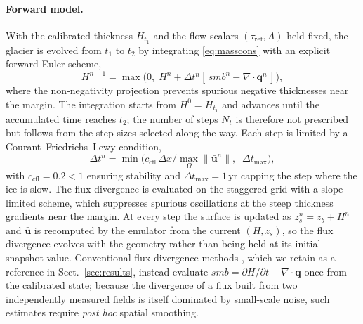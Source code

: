\paragraph{Forward model.}
With the calibrated thickness $H_{t_1}$ and the flow scalars
$(\tau_{\mathrm{ref}}, A)$ held fixed, the glacier is evolved from $t_1$ to $t_2$ by
integrating \eqref{eq:masscons} with an explicit forward-Euler scheme,
\begin{equation}
  H^{n+1} = \max\!\big(0,\; H^n + \Delta t^n [\,smb^n - \nabla\cdot\mathbf{q}^n\,]\big),
  \label{eq:euler}
\end{equation}
where the non-negativity projection prevents spurious negative thicknesses near the
margin. The integration starts from $H^0 = H_{t_1}$ and advances until the accumulated
time reaches $t_2$; the number of steps $N_t$ is therefore not prescribed but follows
from the step sizes selected along the way. Each step is limited by a
Courant--Friedrichs--Lewy condition,
\begin{equation}
  \Delta t^n = \min\!\Big(c_{\mathrm{cfl}}\,\Delta x \big/
  \max_\Omega\|\bar{\mathbf{u}}^n\|,\;\; \Delta t_{\max}\Big),
  \label{eq:cfl}
\end{equation}
with $c_{\mathrm{cfl}} = 0.2 < 1$ ensuring stability and
$\Delta t_{\max} = 1\,\mathrm{yr}$ capping the step where the ice is slow. The flux
divergence is evaluated on the staggered grid with a slope-limited scheme, which
suppresses spurious oscillations at the steep thickness gradients near the margin. At
every step the surface is updated as $z_s^n = z_b + H^n$ and $\bar{\mathbf{u}}$ is
recomputed by the emulator from the current $(H, z_s)$, so the flux divergence evolves
with the geometry rather than being held at its initial-snapshot value. Conventional
flux-divergence methods \citep{miles2021, kneib2024}, which we retain as a reference in
Sect.~\ref{sec:results}, instead evaluate $smb = \partial H/\partial t +
\nabla\cdot\mathbf{q}$ once from the calibrated state; because the divergence of a
flux built from two independently measured fields is itself dominated by small-scale
noise, such estimates require \emph{post hoc} spatial smoothing.

